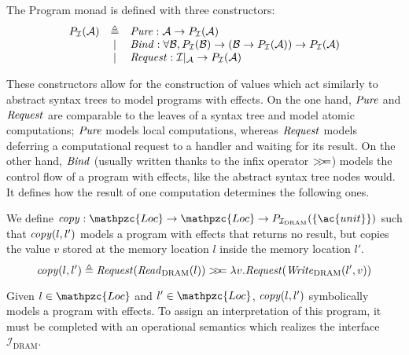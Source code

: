 \begin{definition}
  The Program monad is defined with three constructors:
  \[
    \begin{array}{rcl}
      P_{\mathcal{I}}(\mathcal{A})
      & \triangleq
      & \mathit{Pure} : \mathcal{A} \rightarrow P_{\mathcal{I}}(\mathcal{A}) \\

      & |
      & \mathit{Bind} : \forall \mathcal{B}, P_{\mathcal{I}}(\mathcal{B}) \rightarrow
        (\mathcal{B} \rightarrow P_{\mathcal{I}}(\mathcal{A})) \rightarrow
        P_{\mathcal{I}}(\mathcal{A}) \\

      & |
      & \mathit{Request} : \mathcal{I}|_{\mathcal{A}} \rightarrow
        P_{\mathcal{I}}(\mathcal{A})
    \end{array}
  \]
\end{definition}
%
These constructors allow for the construction of values which act similarly to
abstract syntax trees to model programs with effects.
%
On the one hand, $\mathit{Pure}$ and $\mathit{Request}$ are comparable to the leaves
of a syntax tree and model atomic computations; $\mathit{Pure}$ models local
computations, whereas $\mathit{Request}$ models deferring a computational request
to a handler and waiting for its result.
%
On the other hand, $\mathit{Bind}$ (usually written thanks to the infix operator
$>\!\!>\!\!=$) models the control flow of a program with effects, like the abstract
syntax tree nodes would.
%
It defines how the result of one computation determines the following ones.

\begin{example}[Copy]
  We define
  $\func{copy} : \mathpzc{Loc} \rightarrow \mathpzc{Loc} \rightarrow
  P_{\I_{\mathrm{DRAM}}}(\{\ac{unit}\})$ such that $\mathit{copy}(l, l')$ models a
  program with effects that returns no result, but copies the value $v$ stored
  at the memory location $l$ inside the memory location $l'$.
  \[ \mathit{copy}(l, l') \triangleq
    \mathit{Request}(\mathit{Read}_{\mathrm{DRAM}}(l)) >\!\!>\!\!= \lambda
    v. \mathit{Request}(\mathit{Write}_{\mathrm{DRAM}}(l', v))
  \]
\end{example}

Given $l \in \mathpzc{Loc}$ and $l' \in \mathpzc{Loc}$, $\mathit{copy}(l, l')$
symbolically models a program with effects.
%
To assign an interpretation of this program, it must be completed with an
operational semantics which realizes the interface
$\mathcal{I}_{\mathrm{DRAM}}$.

